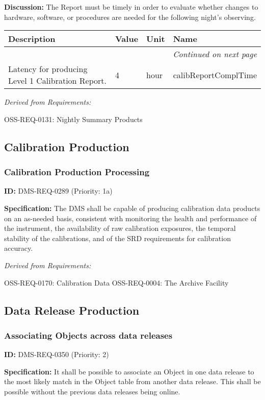 \documentclass[SE,toc,lsstdraft]{lsstdoc}
\makeatletter
\newcommand{\paramname}[1]{\hspace{0pt}#1}
\newcommand{\unitname}[1]{\hspace{0pt}#1}
\newenvironment{parameters}[0]{%
\setlength\LTleft{0pt}
\setlength\LTright{\fill}
\begin{small}
\begin{longtable}[]{|p{0.49\textwidth}|l|p{0.6in}|p{1.70in}@{}|}

\hline \textbf{Description} & \textbf{Value} & \textbf{Unit} & \textbf{Name} \\ \hline
\endhead

\hline \multicolumn{4}{r}{\emph{Continued on next page}} \\
\endfoot

\hline\hline
\endlastfoot
}{%
\hline
\end{longtable}
\end{small}
}
\makeatother
\begin{document}
\textbf{Discussion:} The Report must be timely in order to evaluate whether changes to hardware, software, or procedures are needed for the following night's observing.

\begin{parameters}
Latency for producing Level 1 Calibration Report.
&
4
&
\unitname{%
hour
}
&
\paramname{%
calibReportComplTime
} \\\hline
\end{parameters}

\emph{Derived from Requirements:}

OSS-REQ-0131:
Nightly Summary Products \newline

\subsection{Calibration Production}

\subsubsection{Calibration Production Processing}

\label{DMS-REQ-0289}
\textbf{ID:} DMS-REQ-0289 (Priority: 1a)

\textbf{Specification:} The DMS shall be capable of producing calibration data products on an as-needed basis, consistent with monitoring the health and performance of the instrument, the availability of raw calibration exposures, the temporal stability of the calibrations, and of the SRD requirements for calibration accuracy.

\emph{Derived from Requirements:}

OSS-REQ-0170:
Calibration Data \newline
OSS-REQ-0004:
The Archive Facility \newline

\subsection{Data Release Production}

\subsubsection{Associating Objects across data releases}

\label{DMS-REQ-0350}
\textbf{ID:} DMS-REQ-0350 (Priority: 2)

\textbf{Specification:} It shall be possible to associate an Object in one data release to the most likely match in the Object table from another data release. This shall be possible without the previous data releases being online.
\end{document}
